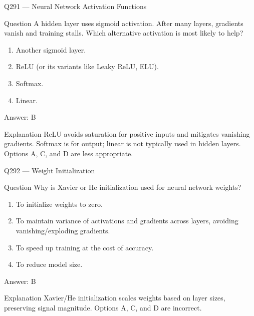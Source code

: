 \documentclass[aspectratio=169,8pt]{beamer}
\begin{document}
\begin{frame}{Q291 --- Neural Network Activation Functions}
\begin{block}{Question}
A hidden layer uses sigmoid activation. After many layers, gradients vanish and training stalls. Which alternative activation is most likely to help?
\begin{enumerate}
\item Another sigmoid layer.
\item ReLU (or its variants like Leaky ReLU, ELU).
\item Softmax.
\item Linear.
\end{enumerate} \end{block}
\begin{exampleblock}{Answer: B}\end{exampleblock}
\begin{block}{Explanation}
ReLU avoids saturation for positive inputs and mitigates vanishing gradients. Softmax is for output; linear is not typically used in hidden layers. Options A, C, and D are less appropriate.
\end{block}
\end{frame}

\begin{frame}{Q292 --- Weight Initialization}
\begin{block}{Question}
Why is Xavier or He initialization used for neural network weights?
\begin{enumerate}
\item To initialize weights to zero.
\item To maintain variance of activations and gradients across layers, avoiding vanishing/exploding gradients.
\item To speed up training at the cost of accuracy.
\item To reduce model size.
\end{enumerate} \end{block}
\begin{exampleblock}{Answer: B}\end{exampleblock}
\begin{block}{Explanation}
Xavier/He initialization scales weights based on layer sizes, preserving signal magnitude. Options A, C, and D are incorrect.
\end{block}
\end{frame}
\end{document}
